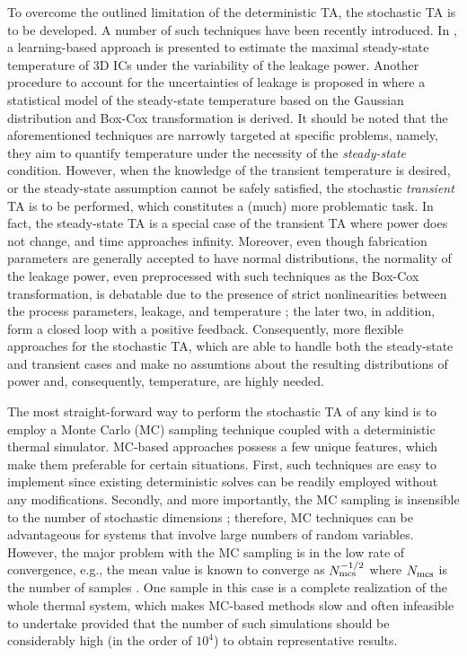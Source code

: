 To overcome the outlined limitation of the deterministic TA, the stochastic TA is to be developed. A number of such techniques have been recently introduced. In \cite{juan2011}, a learning-based approach is presented to estimate the maximal steady-state temperature of 3D ICs under the variability of the leakage power. Another procedure to account for the uncertainties of leakage is proposed in \cite{juan2012} where a statistical model of the steady-state temperature based on the Gaussian distribution and Box-Cox transformation \cite{box1964} is derived. It should be noted that the aforementioned techniques are narrowly targeted at specific problems, namely, they aim to quantify temperature under the necessity of the \emph{steady-state} condition. However, when the knowledge of the transient temperature is desired, or the steady-state assumption cannot be safely satisfied, the stochastic \emph{transient} TA is to be performed, which constitutes a (much) more problematic task. In fact, the steady-state TA is a special case of the transient TA where power does not change, and time approaches infinity. Moreover, even though fabrication parameters are generally accepted to have normal distributions, the normality of the leakage power, even preprocessed with such techniques as the Box-Cox transformation, is debatable due to the presence of strict nonlinearities between the process parameters, leakage, and temperature \cite{liu2007}; the later two, in addition, form a closed loop with a positive feedback. Consequently, more flexible approaches for the stochastic TA, which are able to handle both the steady-state and transient cases and make no assumtions about the resulting distributions of power and, consequently, temperature, are highly needed.

The most straight-forward way to perform the stochastic TA of any kind is to employ a Monte Carlo (MC) sampling technique coupled with a deterministic thermal simulator. MC-based approaches possess a few unique features, which make them preferable for certain situations. First, such techniques are easy to implement since existing deterministic solves can be readily employed without any modifications. Secondly, and more importantly, the MC sampling is insensible to the number of stochastic dimensions \cite{maitre2010}; therefore, MC techniques can be advantageous for systems that involve large numbers of random variables. However, the major problem with the MC sampling is in the low rate of convergence, e.g., the mean value is known to converge as $N_\text{mcs}^{-{{1}/{2}}}$ where $N_\text{mcs}$ is the number of samples \cite{xiu2009, maitre2010}. One sample in this case is a complete realization of the whole thermal system, which makes MC-based methods slow and often infeasible to undertake provided that the number of such simulations should be considerably high (in the order of $10^4$) to obtain representative results.


